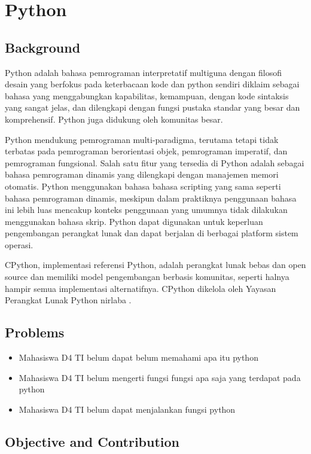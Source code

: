 \section{Python}
\subsection{Background}
\label{Background}
\par
Python adalah bahasa pemrograman interpretatif multiguna dengan filosofi desain yang berfokus pada keterbacaan kode dan python sendiri diklaim sebagai bahasa yang menggabungkan kapabilitas, kemampuan, dengan kode sintaksis yang sangat jelas, dan dilengkapi dengan fungsi pustaka standar yang besar dan komprehensif. Python juga didukung oleh komunitas besar.
\par
Python mendukung pemrograman multi-paradigma, terutama tetapi tidak terbatas pada pemrograman berorientasi objek, pemrograman imperatif, dan pemrograman fungsional. Salah satu fitur yang tersedia di Python adalah sebagai bahasa pemrograman dinamis yang dilengkapi dengan manajemen memori otomatis. Python menggunakan bahasa bahasa scripting yang sama seperti bahasa pemrograman dinamis, meskipun dalam praktiknya penggunaan bahasa ini lebih luas mencakup konteks penggunaan yang umumnya tidak dilakukan menggunakan bahasa skrip. Python dapat digunakan untuk keperluan pengembangan perangkat lunak dan dapat berjalan di berbagai platform sistem operasi.
\par
CPython, implementasi referensi Python, adalah perangkat lunak bebas dan open source dan memiliki model pengembangan berbasis komunitas, seperti halnya hampir semua implementasi alternatifnya. CPython dikelola oleh Yayasan Perangkat Lunak Python nirlaba \cite{monk2013programming}.

\subsection{Problems}
\begin{itemize}
	\item Mahasiswa D4 TI belum dapat belum memahami apa itu python
    \item Mahasiswa D4 TI belum mengerti fungsi fungsi apa saja yang terdapat pada python
    \item Mahasiswa D4 TI belum dapat menjalankan fungsi python
\end{itemize}

\subsection{Objective and Contribution}
